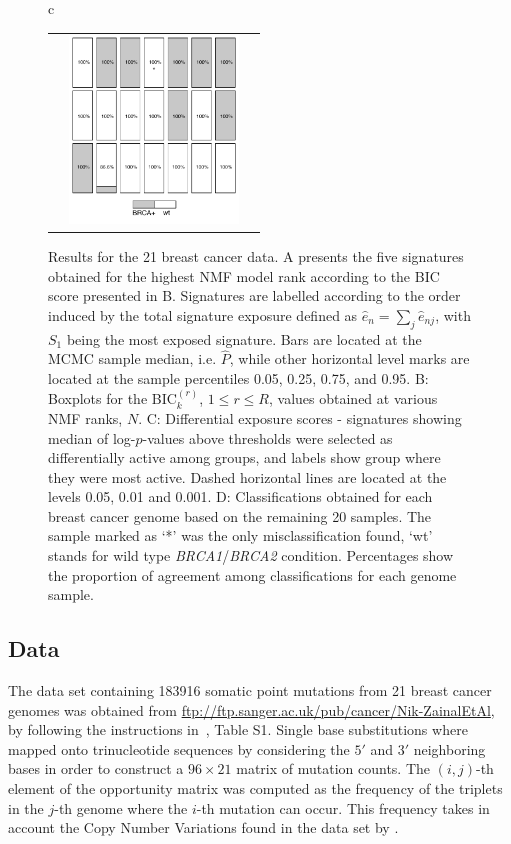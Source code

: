 \documentclass{bioinfo}
\begin{document}
\begin{figure}[htb!]
\begin{tabular}{c}
\begin{tabular}{ccc}
   & 
   \includegraphics[width=4.5cm]{figs/Classific}
 \end{tabular}
 \end{tabular}
 \caption{\textrm{%
    Results for the 21 breast cancer data. A presents the five
    signatures obtained for the highest NMF model rank according to the
    BIC score presented in B. Signatures are labelled according to the
    order induced by the total signature exposure defined as $\hat e_n =
    \sum_{j} \hat e_{nj}$, with $S_1$ being the most exposed
    signature. Bars are located at the MCMC sample median,
    i.e. $\widehat P$, while other horizontal level marks are located
    at the sample percentiles 0.05, 0.25, 0.75, and 0.95.
    B: Boxplots for the BIC$^{(r)}_k$, $1 \leq r \leq R$, values 
    obtained at various NMF ranks, $N$. C: Differential exposure
    scores - signatures
    showing median of log-$p$-values above thresholds were selected as
    differentially active among groups, and labels show group where they
    were most active.  Dashed horizontal lines are located at 
    the levels 0.05, 0.01 and 0.001. D: Classifications
    obtained for each breast cancer genome based on the remaining 20
    samples. The sample marked as `*' was the only
    misclassification found, `wt' stands for wild type
    \emph{BRCA1}/\emph{BRCA2} condition. Percentages show the
    proportion of agreement among classifications for each genome
    sample.
  }
 }\label{fig:bcancer} 
\end{figure}
\subsection{Data} The data set containing 183916 somatic point
mutations from 21 breast cancer genomes was obtained from
\url{ftp://ftp.sanger.ac.uk/pub/cancer/Nik-ZainalEtAl}, by following
the instructions in~\cite{NCell}, Table S1. Single base substitutions
where mapped onto trinucleotide sequences by considering the $5'$ and
$3'$ neighboring bases in order to construct a $96\times 21$ matrix of
mutation counts.  The $(i,j)$-th element of the opportunity matrix was
computed as the frequency of the triplets in the $j$-th genome where
the $i$-th mutation can occur. This frequency takes in account the
Copy Number Variations found in the data set by \cite{NCell}. 
\end{document}
